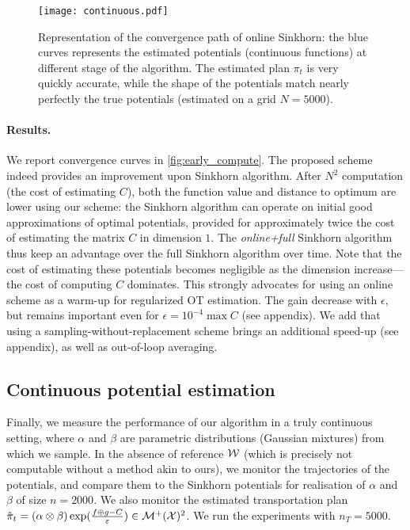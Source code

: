 \begin{figure*}[t]
    \centering
    \texttt{[image: continuous.pdf]}
    \caption{Representation of the convergence path of online Sinkhorn: the blue curves represents the estimated potentials (continuous functions) at different stage of the algorithm. The estimated plan $\pi_t$ is very quickly accurate, while the shape of the potentials match nearly perfectly the true potentials (estimated on a grid $N = 5000$).}
    \label{fig:potentials}
\end{figure*}


\paragraph{Results.} We report convergence curves in
\autoref{fig:early_compute}. The proposed scheme indeed provides an improvement
upon Sinkhorn algorithm. After $N^2$ computation (the cost of estimating $C$),
both the function value and distance to optimum are lower using our scheme: the
Sinkhorn algorithm can operate on initial good approximations of optimal
potentials, provided for approximately twice the cost of estimating the matrix
$C$ in dimension $1$. The \textit{online+full} Sinkhorn algorithm thus keep an
advantage over the full Sinkhorn algorithm over time. Note that the cost of
estimating these potentials becomes negligible as the dimension increase---the
cost of computing $C$ dominates. This strongly advocates for using an online
scheme as a warm-up for regularized OT estimation. The gain decrease with
$\epsilon$, but remains important even for $\epsilon = 10^{-4} \max C$ (see
appendix). We add that using a
sampling-without-replacement scheme brings an additional speed-up (see appendix), as well as out-of-loop averaging.

\subsection{Continuous potential estimation}

Finally, we measure the performance of our algorithm in a truly continuous
setting, where $\alpha$ and $\beta$ are parametric distributions (Gaussian
mixtures) from which we sample. In the absence of reference $\mathcal{W}$ (which is
precisely not computable without a method akin to ours), we monitor the
trajectories of the potentials, and compare them to the Sinkhorn potentials for
realisation of $\alpha$ and $\beta$ of size $n=2000$. We also monitor the
estimated transportation plan $\hat \pi_t = (\alpha \otimes \beta)
\exp(\frac{f\oplus g - C}{\varepsilon}) \in \mathcal{M}^+(\mathcal{X})^2$. We run the experiments with
$n_T=5000$.

